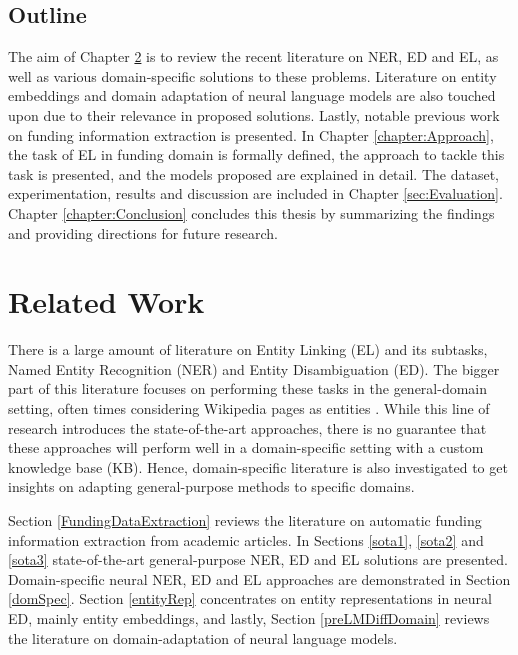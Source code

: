 \documentclass{report}
\theoremstyle{definition}
\theoremstyle{remark}
\begin{document}
\section{Outline}
The aim of Chapter \ref{chap:rw} is to review the recent literature on NER, ED and EL, as well as various domain-specific solutions to these problems. Literature on entity embeddings and domain adaptation of neural language models are also touched upon due to their relevance in proposed solutions. Lastly, notable previous work on funding information extraction is presented. In Chapter \ref{chapter:Approach}, the task of EL in funding domain is formally defined, the approach to tackle this task is presented, and the models proposed are explained in detail. The dataset, experimentation, results and discussion are included in Chapter \ref{sec:Evaluation}. Chapter \ref{chapter:Conclusion} concludes this thesis by summarizing the findings and providing directions for future research.

\chapter{Related Work}
\label{chap:rw}
There is a large amount of literature on Entity Linking (EL) and its subtasks, Named Entity Recognition (NER) and Entity Disambiguation (ED). The bigger part of this literature focuses on performing these tasks in the general-domain setting, often times considering Wikipedia pages as entities \cite{nlpnotes}. While this line of research introduces the state-of-the-art approaches, there is no guarantee that these approaches will perform well in a domain-specific setting with a custom knowledge base (KB). Hence, domain-specific literature is also investigated to get insights on adapting general-purpose methods to specific domains.

Section \ref{FundingDataExtraction} reviews the literature on automatic funding information extraction from academic articles. In Sections \ref{sota1}, \ref{sota2} and \ref{sota3} state-of-the-art general-purpose NER, ED and EL solutions are presented. Domain-specific neural NER, ED and EL approaches are demonstrated in Section \ref{domSpec}. Section \ref{entityRep} concentrates on entity representations in neural ED, mainly entity embeddings, and lastly, Section \ref{preLMDiffDomain} reviews the literature on domain-adaptation of neural language models.
\end{document}

